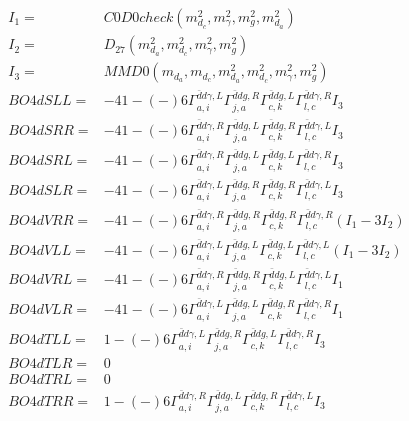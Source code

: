 \documentclass[A4,landscape]{article}
\begin{document}
\begin{align} 
I_1 = & C0D0check(m^2_{d_{{c}}}, m^2_{\gamma}, m^2_{g}, m^2_{d_{{a}}}) \\ 
I_2 = & D_{27}(m^2_{d_{{a}}}, m^2_{d_{{c}}}, m^2_{\gamma}, m^2_{g}) \\ 
I_3 = & MMD0(m_{d_{{a}}}, m_{d_{{c}}}, m^2_{d_{{a}}}, m^2_{d_{{c}}}, m^2_{\gamma}, m^2_{g}) \\ 
  BO4dSLL= & -4   1
-(-)
  6 \Gamma^{\bar{d}d \gamma ,L}_{a, i} \Gamma^{\bar{d}d g ,R}_{j, a} \Gamma^{\bar{d}d g ,L}_{c, k} \Gamma^{\bar{d}d \gamma ,R}_{l, c} I_3 \\ 
  BO4dSRR= & -4   1
-(-)
  6 \Gamma^{\bar{d}d \gamma ,R}_{a, i} \Gamma^{\bar{d}d g ,L}_{j, a} \Gamma^{\bar{d}d g ,R}_{c, k} \Gamma^{\bar{d}d \gamma ,L}_{l, c} I_3 \\ 
  BO4dSRL= & -4   1
-(-)
  6 \Gamma^{\bar{d}d \gamma ,R}_{a, i} \Gamma^{\bar{d}d g ,L}_{j, a} \Gamma^{\bar{d}d g ,L}_{c, k} \Gamma^{\bar{d}d \gamma ,R}_{l, c} I_3 \\ 
  BO4dSLR= & -4   1
-(-)
  6 \Gamma^{\bar{d}d \gamma ,L}_{a, i} \Gamma^{\bar{d}d g ,R}_{j, a} \Gamma^{\bar{d}d g ,R}_{c, k} \Gamma^{\bar{d}d \gamma ,L}_{l, c} I_3 \\ 
  BO4dVRR= & -4   1
-(-)
  6 \Gamma^{\bar{d}d \gamma ,R}_{a, i} \Gamma^{\bar{d}d g ,R}_{j, a} \Gamma^{\bar{d}d g ,R}_{c, k} \Gamma^{\bar{d}d \gamma ,R}_{l, c} (I_1 - 3 I_2) \\ 
  BO4dVLL= & -4   1
-(-)
  6 \Gamma^{\bar{d}d \gamma ,L}_{a, i} \Gamma^{\bar{d}d g ,L}_{j, a} \Gamma^{\bar{d}d g ,L}_{c, k} \Gamma^{\bar{d}d \gamma ,L}_{l, c} (I_1 - 3 I_2) \\ 
  BO4dVRL= & -4   1
-(-)
  6 \Gamma^{\bar{d}d \gamma ,R}_{a, i} \Gamma^{\bar{d}d g ,R}_{j, a} \Gamma^{\bar{d}d g ,L}_{c, k} \Gamma^{\bar{d}d \gamma ,L}_{l, c} I_1 \\ 
  BO4dVLR= & -4   1
-(-)
  6 \Gamma^{\bar{d}d \gamma ,L}_{a, i} \Gamma^{\bar{d}d g ,L}_{j, a} \Gamma^{\bar{d}d g ,R}_{c, k} \Gamma^{\bar{d}d \gamma ,R}_{l, c} I_1 \\ 
  BO4dTLL= &   1
-(-)
  6 \Gamma^{\bar{d}d \gamma ,L}_{a, i} \Gamma^{\bar{d}d g ,R}_{j, a} \Gamma^{\bar{d}d g ,L}_{c, k} \Gamma^{\bar{d}d \gamma ,R}_{l, c} I_3 \\ 
  BO4dTLR= & 0 \\ 
  BO4dTRL= & 0 \\ 
  BO4dTRR= &   1
-(-)
  6 \Gamma^{\bar{d}d \gamma ,R}_{a, i} \Gamma^{\bar{d}d g ,L}_{j, a} \Gamma^{\bar{d}d g ,R}_{c, k} \Gamma^{\bar{d}d \gamma ,L}_{l, c} I_3 \\ 
\end{align} 
\end{document}
